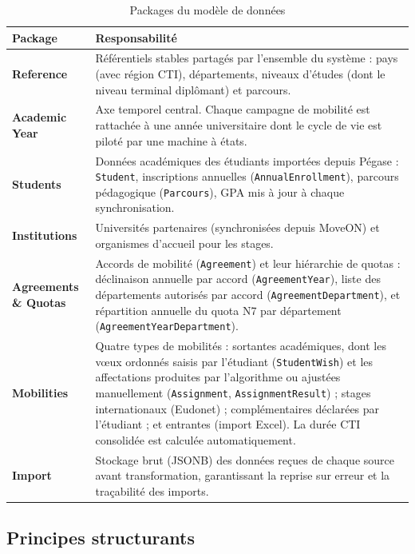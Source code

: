 \renewcommand{\arraystretch}{1.4}
\begin{table}[H]
\centering
\caption{Packages du modèle de données}
\label{tab:packages_modele}
\footnotesize
\begin{tabular}{|p{3.5cm}|p{11cm}|}
\hline
\rowcolor{gray!20}
\textbf{Package} & \textbf{Responsabilité} \\
\hline
\textbf{Reference} &
Référentiels stables partagés par l'ensemble du système :
pays (avec région CTI), départements, niveaux d'études
(dont le niveau terminal diplômant) et parcours. \\
\hline
\textbf{Academic Year} &
Axe temporel central. Chaque campagne de mobilité est rattachée
à une année universitaire dont le cycle de vie est piloté par
une machine à états. \\
\hline
\textbf{Students} &
Données académiques des étudiants importées depuis Pégase :
\texttt{Student}, inscriptions annuelles (\texttt{AnnualEnrollment}),
parcours pédagogique (\texttt{Parcours}), GPA mis à jour à chaque synchronisation. \\
\hline
\textbf{Institutions} &
Universités partenaires (synchronisées depuis MoveON) et
organismes d'accueil pour les stages. \\
\hline
\textbf{Agreements \& Quotas} &
Accords de mobilité (\texttt{Agreement}) et leur hiérarchie de quotas :
déclinaison annuelle par accord (\texttt{AgreementYear}),
liste des départements autorisés par accord (\texttt{AgreementDepartment}),
et répartition annuelle du quota N7 par département (\texttt{AgreementYearDepartment}). \\
\hline
\textbf{Mobilities} &
Quatre types de mobilités : sortantes académiques, dont les vœux
ordonnés saisis par l'étudiant (\texttt{StudentWish}) et les
affectations produites par l'algorithme ou ajustées manuellement
(\texttt{Assignment}, \texttt{AssignmentResult}) ; stages
internationaux (Eudonet) ; complémentaires déclarées par
l'étudiant ; et entrantes (import Excel).
La durée CTI consolidée est calculée automatiquement. \\
\hline
\textbf{Import} &
Stockage brut (JSONB) des données reçues de chaque source
avant transformation, garantissant la reprise sur erreur
et la traçabilité des imports. \\
\hline
\end{tabular}
\end{table}

\subsection{Principes structurants}

